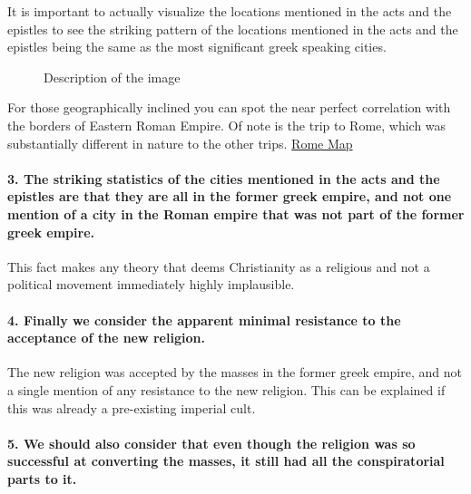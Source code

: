 It is important to actually visualize the locations mentioned in the acts and the epistles to see the striking pattern of the locations mentioned in the acts and the epistles being the same as the most significant greek speaking cities.

\begin{figure}
\centering
{}
\caption{Description of the image}\label{fig:figure}
\end{figure}

For those geographically inclined you can spot the near perfect correlation with the borders of Eastern Roman Empire.
Of note is the trip to Rome, which was substantially different in nature to the other trips.
\href{https://en.wikipedia.org/wiki/Byzantine_Empire_under_the_Theodosian_dynasty\#/media/File:4KTHEODOSIAN.png}{Rome Map}

\paragraph{3.
The striking statistics of the cities mentioned in the acts and the epistles are that they are all in the former greek empire, and not one mention of a city in the Roman empire that was not part of the former greek empire.}\label{par:the-striking-statistics-of-the-cities-mentioned-in-the-acts-and-the-epistles-are-that-they-are-all-in-the-former-greek-empire-and-not-one-mention-of-a-city-in-the-roman-empire-that-was-not-part-of-the-former-greek-empire.}

This fact makes any theory that deems Christianity as a religious and not a political movement immediately highly implausible.

\paragraph{4.
Finally we consider the apparent minimal resistance to the acceptance of the new religion.}\label{par:finally-we-consider-the-apparent-minimal-resistance-to-the-acceptance-of-the-new-religion.}

The new religion was accepted by the masses in the former greek empire, and not a single mention of any resistance to the new religion.
This can be explained if this was already a pre-existing imperial cult.

\paragraph{5.
We should also consider that even though the religion was so successful at converting the masses, it still had all the conspiratorial parts to it.}\label{par:we-should-also-consider-that-even-though-the-religion-was-so-successful-at-converting-the-masses-it-still-had-all-the-conspiratorial-parts-to-it.}

